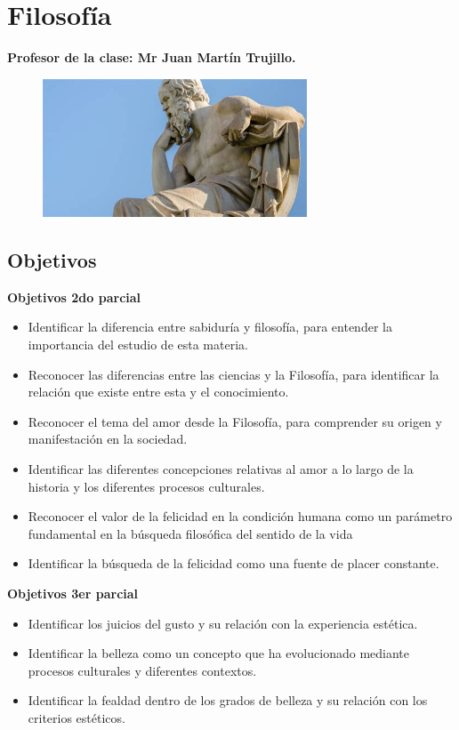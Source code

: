 \documentclass[a4paper, 12pt]{article}
\begin{document}
\section{Filosofía}
\textbf{Profesor de la clase: Mr Juan Martín Trujillo.}

\begin{figure}[h]
  \includegraphics[width=0.7\textwidth, center]{filo.jpeg}
\end{figure}

\subsection{Objetivos}

\textbf{Objetivos 2do parcial}

\begin{itemize}

  \item Identificar la diferencia entre sabiduría y filosofía, para entender la importancia del estudio de esta materia.
  \item Reconocer las diferencias entre las ciencias y la Filosofía, para identificar la relación que existe entre esta y el conocimiento.
  \item Reconocer el tema del amor desde la Filosofía, para comprender su origen y manifestación en la sociedad.
  \item Identificar las diferentes concepciones relativas al amor a lo largo de la historia y los diferentes procesos culturales.
  \item Reconocer el valor de la felicidad en la condición humana como un parámetro fundamental en la búsqueda filosófica del sentido de la vida
  \item Identificar la búsqueda de la felicidad como una fuente de placer constante.

\end{itemize}

\textbf{Objetivos 3er parcial}

\begin{itemize}

  \item Identificar los juicios del gusto y su relación con la experiencia estética.
  \item Identificar la belleza como un concepto que ha evolucionado mediante procesos culturales y diferentes contextos.
  \item Identificar la fealdad dentro de los grados de belleza y su relación con los criterios estéticos.

\end{itemize}
\end{document}

